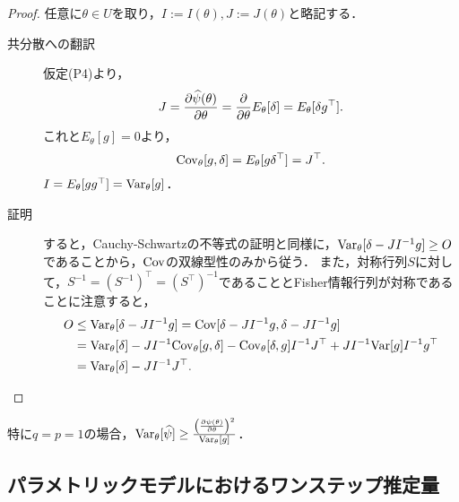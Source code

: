 \documentclass[uplatex, dvipdfmx]{jsarticle}
\begin{document}
\begin{proof}
    任意に$\theta\in U$を取り，$I:=I(\theta),J:=J(\theta)$と略記する．
    \begin{description}
        \item[共分散への翻訳] 仮定(P4)より，
        \[J=\frac{\partial \widehat{\psi}(\theta)}{\partial \theta}=\frac{\partial }{\partial \theta}E_\theta[\delta]=E_\theta[\delta g^\top].\]
        これと$E_\theta[g]=0$より，
        \[\mathrm{Cov}_\theta[g,\delta]=E_\theta[g\delta^\top]=J^\top.\]
        $I=E_\theta[gg^\top]=\mathrm{Var}_\theta[g]$．
        \item[証明] すると，Cauchy-Schwartzの不等式の証明と同様に，$\mathrm{Var}_\theta[\delta-JI^{-1}g]\ge O$であることから，$\mathrm{Cov}$の双線型性のみから従う．
        また，対称行列$S$に対して，$S^{-1}=(S^{-1})^\top=(S^\top)^{-1}$であることとFisher情報行列が対称であることに注意すると，
        \begin{align*}
            O&\le\mathrm{Var}_\theta[\delta-JI^{-1}g]=\mathrm{Cov}[\delta-JI^{-1}g,\delta-JI^{-1}g]\\
            &=\mathrm{Var}_\theta[\delta]-JI^{-1}\mathrm{Cov}_\theta[g,\delta]-\mathrm{Cov}_\theta[\delta,g]I^{-1} J^\top+JI^{-1}\mathrm{Var}[g]I^{-1}g^\top\\
            &=\mathrm{Var}_\theta[\delta]-JI^{-1}J^\top.
        \end{align*}
    \end{description}
\end{proof}


\begin{corollary}\label{cor-Cramer-Rao}
    特に$q=p=1$の場合，$\mathrm{Var}_\theta[\widehat{\psi}]\ge\frac{\left(\frac{\partial \psi(\theta)}{\partial \theta}\right)^2}{\mathrm{Var}_\theta[g]}$．
\end{corollary}

\subsection{パラメトリックモデルにおけるワンステップ推定量}

\begin{tcolorbox}[colframe=ForestGreen, colback=ForestGreen!10!white,breakable,colbacktitle=ForestGreen!40!white,coltitle=black,fonttitle=\bfseries\sffamily,
title=]
    
\end{tcolorbox}
\end{document}
